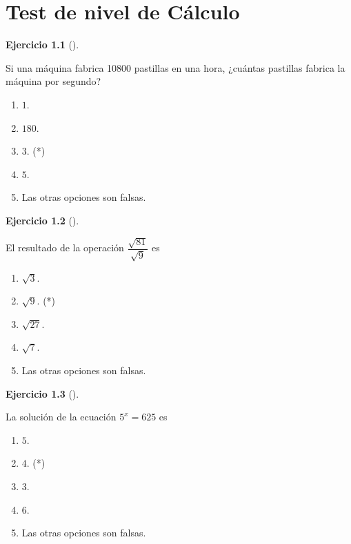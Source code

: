 \documentclass[
  a4paper,
]{scrreport}
\theoremstyle{definition}
\newtheorem{exercise}{Ejercicio}[chapter]
\theoremstyle{remark}
\begin{document}

\chapter{Test de nivel de Cálculo}\label{test-de-nivel-de-cuxe1lculo}

\begin{exercise}[]\protect\hypertarget{exr-01}{}\label{exr-01}

Si una máquina fabrica 10800 pastillas en una hora, ¿cuántas pastillas
fabrica la máquina por segundo?

\begin{enumerate}
\def\labelenumi{\alph{enumi}.}
\item
  \(1\).
\item
  \(180\).
\item
  \(3\). (*)
\item
  \(5\).
\item
  Las otras opciones son falsas.
\end{enumerate}

\end{exercise}

\begin{exercise}[]\protect\hypertarget{exr-02}{}\label{exr-02}

El resultado de la operación \(\dfrac{\sqrt{81}}{\sqrt{9}}\) es

\begin{enumerate}
\def\labelenumi{\alph{enumi}.}
\item
  \(\sqrt{3}\).
\item
  \(\sqrt{9}\). (*)
\item
  \(\sqrt{27}\).
\item
  \(\sqrt{7}\).
\item
  Las otras opciones son falsas.
\end{enumerate}

\end{exercise}

\begin{exercise}[]\protect\hypertarget{exr-03}{}\label{exr-03}

La solución de la ecuación \(5^x=625\) es

\begin{enumerate}
\def\labelenumi{\alph{enumi}.}
\item
  \(5\).
\item
  \(4\). (*)
\item
  \(3\).
\item
  \(6\).
\item
  Las otras opciones son falsas.
\end{enumerate}

\end{exercise}
\end{document}
